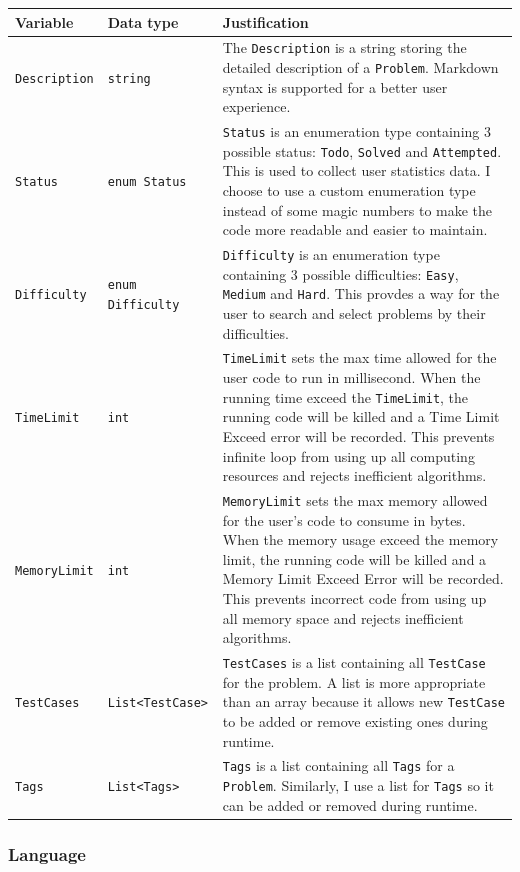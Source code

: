 \documentclass[a4paper]{report}
\newcommand{\code}{\texttt}
\begin{document}
\begin{tabulary}{\textwidth}{|l|l|L|}
    \hline
    Variable & Data type & Justification \\
    \hline
    \code{Description} & \code{string} & The \code{Description} is a string storing the detailed description of a \code{Problem}. Markdown syntax is supported for a better user experience. \\
    \hline
    \code{Status} & \code{enum Status} & \code{Status} is an enumeration type containing 3 possible status: \code{Todo}, \code{Solved} and \code{Attempted}. This is used to collect user statistics data. I choose to use a custom enumeration type instead of some magic numbers to make the code more readable and easier to maintain. \\
    \hline
    \code{Difficulty} & \code{enum Difficulty} & \code{Difficulty} is an enumeration type containing 3 possible difficulties: \code{Easy}, \code{Medium} and \code{Hard}. This provdes a way for the user to search and select problems by their difficulties. \\
    \hline
    \code{TimeLimit} & \code{int} & \code{TimeLimit} sets the max time allowed for the user code to run in millisecond. When the running time exceed the \code{TimeLimit}, the running code will be killed and a Time Limit Exceed error will be recorded. This prevents infinite loop from using up all computing resources and rejects inefficient algorithms. \\
    \hline
    \code{MemoryLimit} & \code{int} & \code{MemoryLimit} sets the max memory allowed for the user's code to consume in bytes. When the memory usage exceed the memory limit, the running code will be killed and a Memory Limit Exceed Error will be recorded. This prevents incorrect code from using up all memory space and rejects inefficient algorithms. \\
    \hline
    \code{TestCases} & \code{List<TestCase>} & \code{TestCases} is a list containing all \code{TestCase} for the problem. A list is more appropriate than an array because it allows new \code{TestCase} to be added or remove existing ones during runtime. \\
    \hline
    \code{Tags} & \code{List<Tags>} & \code{Tags} is a list containing all \code{Tags} for a \code{Problem}. Similarly, I use a list for \code{Tags} so it can be added or removed during runtime. \\
    \hline
\end{tabulary}

\subsubsection{Language}
\end{document}

